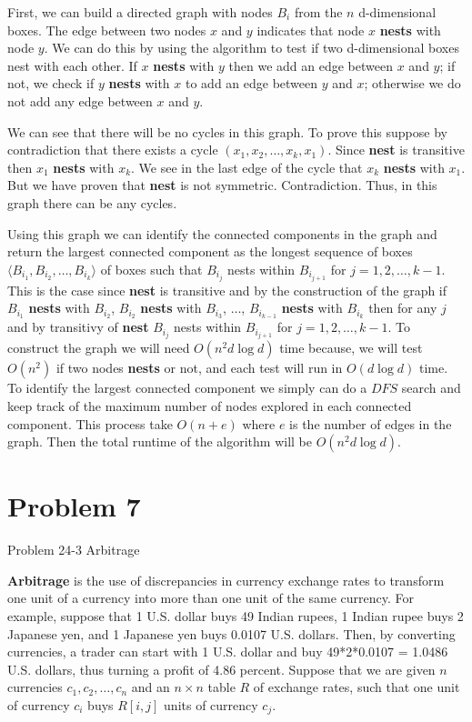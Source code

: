 \documentclass[a4paper, 11pt]{article}
\begin{document}
\begin{itemize}
	First, we can build a directed graph with nodes $B_i$ from the $n$ d-dimensional boxes. The edge between two nodes $x$ and $y$ indicates that node $x$ \textbf{nests} with node $y$. We can do this by using the algorithm to test if two d-dimensional boxes nest with each other. If $x$ \textbf{nests} with $y$ then we add an edge between $x$ and $y$; if not, we check if $y$ \textbf{nests} with $x$ to add an edge between $y$ and $x$; otherwise we do not add any edge between $x$ and $y$. 

	We can see that there will be no cycles in this graph. To prove this suppose by contradiction that there exists a cycle $(x_1, x_2, \dots, x_k, x_1)$. Since \textbf{nest} is transitive then $x_1$ \textbf{nests} with $x_k$. We see in the last edge of the cycle that $x_k$ \textbf{nests} with $x_1$. But we have proven that \textbf{nest} is not symmetric. Contradiction. Thus, in this graph there can be any cycles. 

	Using this graph we can identify the connected components in the graph and return the largest connected component as the longest sequence of boxes $\langle B_{i_1}, B_{i_2}, \dots, B_{i_k} \rangle$ of boxes such that $B_{i_j}$	nests within $B_{i_{j + 1}}$ for $j = 1, 2, \dots, k - 1$. This is the case since \textbf{nest} is transitive and by the construction of the graph if $B_{i_1}$ \textbf{nests} with $B_{i_2}$, $B_{i_2}$ \textbf{nests} with $B_{i_3}$, $\dots$, $B_{i_{k-1}}$ \textbf{nests} with $B_{i_k}$ then for any $j$ and by transitivy of \textbf{nest} $B_{i_j}$	nests within $B_{i_{j + 1}}$ for $j = 1, 2, \dots, k - 1$. To construct the graph we will need $O(n^2 d \log d)$ time because, we will test $O(n^2)$ if two nodes \textbf{nests} or not, and each test will run in $O(d \log d)$ time. To identify the largest connected component we simply can do a $DFS$ search and keep track of the maximum number of nodes explored in each connected component. This process take $O(n + e)$ where $e$ is the number of edges in the graph. Then the total runtime of the algorithm will be $O(n^2 d \log d)$.

\end{itemize}

\section*{Problem 7}

Problem 24-3 Arbitrage

\textbf{Arbitrage} is the use of discrepancies in currency exchange rates to transform one unit of a currency into more than one unit of the same currency. For example, suppose that 1 U.S. dollar buys 49 Indian rupees, 1 Indian rupee buys 2 Japanese yen, and 1 Japanese yen buys 0.0107 U.S. dollars. Then, by converting currencies, a trader can start with 1 U.S. dollar and buy 49*2*0.0107 = 1.0486 U.S. dollars, thus turning a profit of 4.86 percent.
Suppose that we are given $n$ currencies $c_1, c_2, \dots, c_n$ and an $n \times n$ table $R$ of exchange rates, such that one unit of currency $c_i$ buys $R[i, j]$ units of currency $c_j$.
\end{document}
